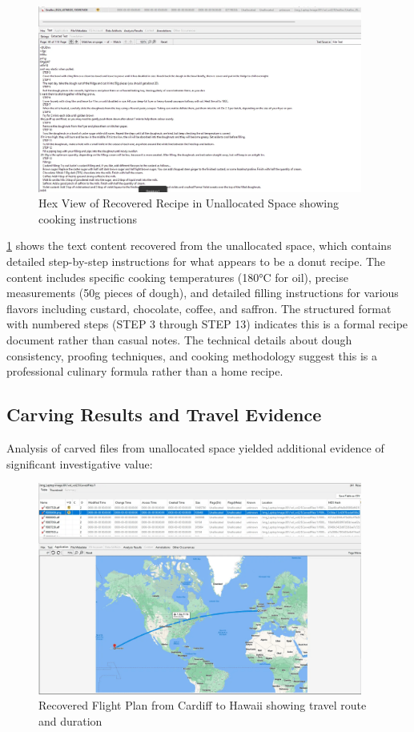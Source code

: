 \begin{figure}[h]
    \centering
    \includegraphics[width=0.95\textwidth]{images/Evidence Examination/Image4.png}
    \caption{Hex View of Recovered Recipe in Unallocated Space showing cooking instructions}
    \label{fig:hex_view}
\end{figure}

\ref{fig:hex_view} shows the text content recovered from the unallocated space, which contains detailed step-by-step instructions for what appears to be a donut recipe. The content includes specific cooking temperatures (180°C for oil), precise measurements (50g pieces of dough), and detailed filling instructions for various flavors including custard, chocolate, coffee, and saffron. The structured format with numbered steps (STEP 3 through STEP 13) indicates this is a formal recipe document rather than casual notes. The technical details about dough consistency, proofing techniques, and cooking methodology suggest this is a professional culinary formula rather than a home recipe.

\subsection{Carving Results and Travel Evidence}
Analysis of carved files from unallocated space yielded additional evidence of significant investigative value:

\begin{figure}[h]
    \centering
    \includegraphics[width=0.95\textwidth]{images/Evidence Examination/Image5.png}
    \caption{Recovered Flight Plan from Cardiff to Hawaii showing travel route and duration}
    \label{fig:flight_plan}
\end{figure}

